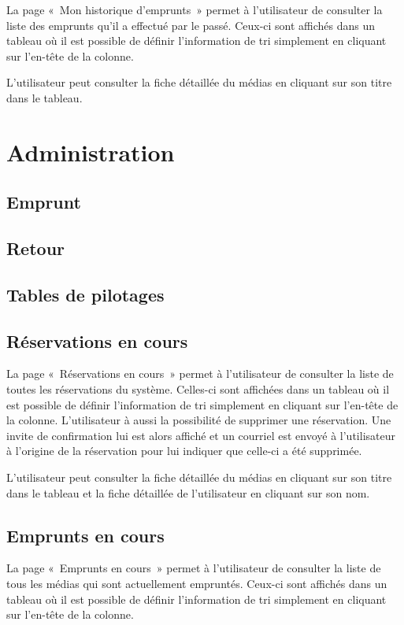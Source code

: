 \documentclass[letter, 11pt]{report}
\begin{document}
La page «~Mon historique d'emprunts~» permet à l'utilisateur de consulter la liste des emprunts qu'il a effectué par le passé. Ceux-ci sont affichés dans un tableau où il est possible de définir l'information de tri simplement en cliquant sur l'en-tête de la colonne.

L'utilisateur peut consulter la fiche détaillée du médias en cliquant sur son titre dans le tableau.

\section{Administration}

\subsection{Emprunt}

\subsection{Retour}

\subsection{Tables de pilotages}

\subsection{Réservations en cours}
La page «~Réservations en cours~» permet à l'utilisateur de consulter la liste de toutes les réservations du système. Celles-ci sont affichées dans un tableau où il est possible de définir l'information de tri simplement en cliquant sur l'en-tête de la colonne. L'utilisateur à aussi la possibilité de supprimer une réservation. Une invite de confirmation lui est alors affiché et un courriel est envoyé à l'utilisateur à l'origine de la réservation pour lui indiquer que celle-ci a été supprimée.

L'utilisateur peut consulter la fiche détaillée du médias en cliquant sur son titre dans le tableau et la fiche détaillée de l'utilisateur en cliquant sur son nom.

\subsection{Emprunts en cours}
La page «~Emprunts en cours~» permet à l'utilisateur de consulter la liste de tous les médias qui sont actuellement empruntés. Ceux-ci sont affichés dans un tableau où il est possible de définir l'information de tri simplement en cliquant sur l'en-tête de la colonne.
\end{document}
